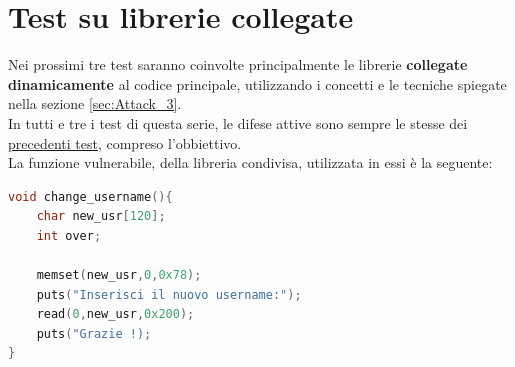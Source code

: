 \section{Test su librerie collegate}
\label{sec:Test_3}
Nei prossimi tre test saranno coinvolte principalmente le librerie \textbf{collegate dinamicamente} al codice principale, utilizzando i concetti e le tecniche spiegate nella sezione \ref{sec:Attack_3}.\\
In tutti e tre i test di questa serie, le difese attive sono sempre le stesse dei \hyperref[fig:checksec1]{precedenti test}, compreso l'obbiettivo.\\
La funzione vulnerabile, della libreria condivisa, utilizzata in essi è la seguente:
\begin{lstlisting}[language=C, label=change username, caption={Funzione \textbf{change\_username()} della libreria condivisa.}, style=C lang]
void change_username(){
    char new_usr[120];
    int over;

    memset(new_usr,0,0x78);
    puts("Inserisci il nuovo username:");
    read(0,new_usr,0x200);
    puts("Grazie !);
}
\end{lstlisting}

